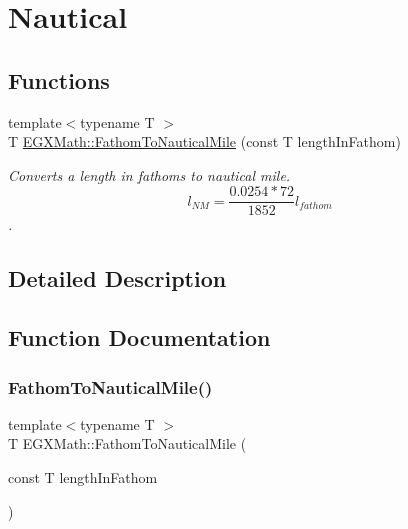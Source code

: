 \hypertarget{group___e_g_x_math-_conversions-_length_conversions-_nautical-_fathom-_nautical}{}\section{Nautical}
\label{group___e_g_x_math-_conversions-_length_conversions-_nautical-_fathom-_nautical}
\subsection*{Functions}
\begin{DoxyCompactItemize}
\item 
{\footnotesize template$<$typename T $>$ }\\T \mbox{\hyperlink{group___e_g_x_math-_conversions-_length_conversions-_nautical-_fathom-_nautical_gad39e9317e15dc0e98e3a00cf83939df7}{E\+G\+X\+Math\+::\+Fathom\+To\+Nautical\+Mile}} (const T length\+In\+Fathom)
\begin{DoxyCompactList}\small\item\em Converts a length in fathoms to nautical mile. \[ l_{NM}= \frac{0.0254 * 72}{1852} l_{fathom} \]. \end{DoxyCompactList}\end{DoxyCompactItemize}


\subsection{Detailed Description}


\subsection{Function Documentation}
\mbox{\label{group___e_g_x_math-_conversions-_length_conversions-_nautical-_fathom-_nautical_gad39e9317e15dc0e98e3a00cf83939df7}} 
\subsubsection{\texorpdfstring{Fathom\+To\+Nautical\+Mile()}{FathomToNauticalMile()}}
{\footnotesize\ttfamily template$<$typename T $>$ \\
T E\+G\+X\+Math\+::\+Fathom\+To\+Nautical\+Mile (\begin{DoxyParamCaption}\item[{const T}]{length\+In\+Fathom }\end{DoxyParamCaption})}



